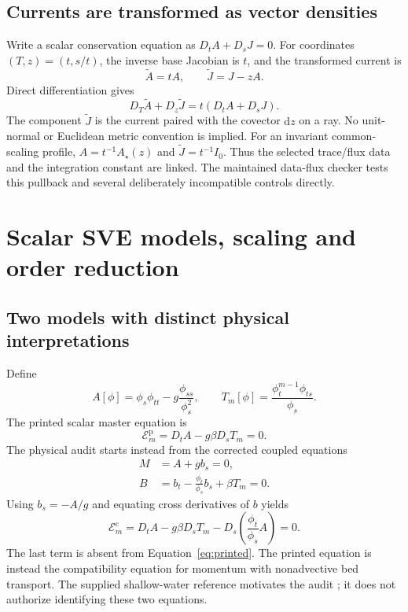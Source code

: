 \documentclass[12pt,a4paper,oneside]{report}
\numberwithin{equation}{chapter}
\newcommand{\E}{\mathcal E}
\newcommand{\dd}{\mathrm d}
\begin{document}
\section{Currents are transformed as vector densities}
Write a scalar conservation equation as $D_tA+D_sJ=0$. For coordinates
$(T,z)=(t,s/t)$, the inverse base Jacobian is $t$, and the transformed current
is
\begin{equation}\label{eq:current}
\widetilde A=tA,\qquad\widetilde J=J-zA.
\end{equation}
Direct differentiation gives
\begin{equation}
D_T\widetilde A+D_z\widetilde J=t(D_tA+D_sJ).
\end{equation}
The component $\widetilde J$ is the current paired with the covector $\dd z$
on a ray. No unit-normal or Euclidean metric convention is implied.
For an invariant common-scaling profile, $A=t^{-1}A_\star(z)$ and
$\widetilde J=t^{-1}I_0$. Thus the selected trace/flux data and the integration
constant are linked. The maintained data-flux checker tests this pullback and
several deliberately incompatible controls directly.

\chapter{Scalar SVE models, scaling and order reduction}\label{ch:sve}
\section{Two models with distinct physical interpretations}
Define
\begin{equation}
A[\phi]=\phi_s\phi_{tt}-g\frac{\phi_{ss}}{\phi_s^2},\qquad
T_m[\phi]=\frac{\phi_t^{m-1}\phi_{ts}}{\phi_s}.
\end{equation}
The printed scalar master equation is
\begin{equation}\label{eq:printed}
\E_m^{\mathrm p}=D_tA-g\beta D_sT_m=0.
\end{equation}
The physical audit starts instead from the corrected coupled equations
\begin{align}
M&=A+g b_s=0,\label{eq:momentum}\\
B&=b_t-\frac{\phi_t}{\phi_s}b_s+\beta T_m=0.\label{eq:bed}
\end{align}
Using $b_s=-A/g$ and equating cross derivatives of $b$ yields
\begin{equation}\label{eq:corrected}
\E_m^{\mathrm c}=D_tA-g\beta D_sT_m
 -D_s\left(\frac{\phi_t}{\phi_s}A\right)=0.
\end{equation}
The last term is absent from Equation~\eqref{eq:printed}. The printed equation
is instead the compatibility equation for momentum with nonadvective bed
transport. The supplied shallow-water reference motivates the audit
\cite{ap}; it does not authorize identifying these two equations.
\end{document}
